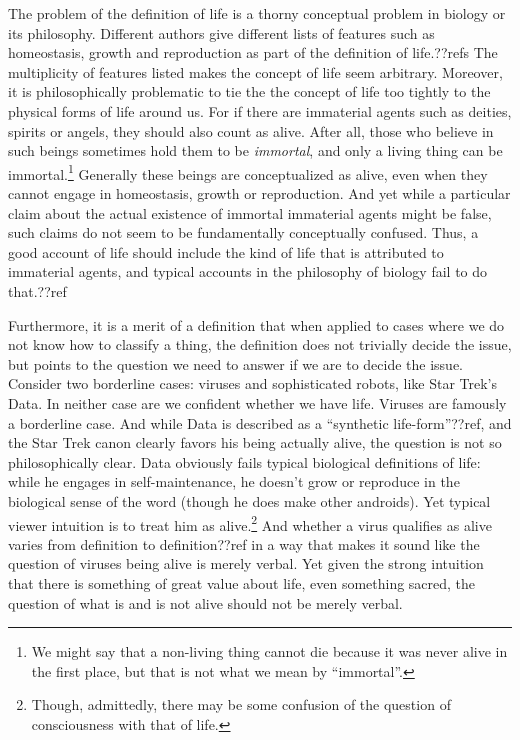 The problem of the definition of life is a thorny conceptual problem in biology or its philosophy. Different authors give different lists of features such
as homeostasis, growth and reproduction as part of the definition of life.??refs The multiplicity of features listed makes the concept of life seem arbitrary.
Moreover, it is philosophically problematic to tie the the concept of life too tightly to the physical forms of life around us. For if there are immaterial agents such as deities, spirits or angels, they should also count as alive.
 After all, those who believe in such beings sometimes
hold them to be \textit{immortal}, and only a living thing can be immortal.\footnote{We might say that a non-living
thing cannot die because it was never alive in the first place, but that is not what we mean by ``immortal''.}
Generally these beings are conceptualized as alive, even when they cannot engage in homeostasis, growth or reproduction. And yet while a particular 
claim about the actual existence of immortal immaterial agents might be false, such claims do not seem to be fundamentally conceptually confused. Thus, a good account
of life should include the kind of life that is attributed to immaterial agents, and typical accounts in the philosophy of biology fail to do that.??ref

Furthermore, it is a merit of a definition that when applied to cases where we do not know how to classify a thing, the definition does not trivially
decide the issue, but points to the question we need to answer if we are to decide the issue. Consider two borderline cases: viruses
and sophisticated robots, like Star Trek's Data. In neither case are we confident whether we have life. Viruses are famously a borderline case.
And while Data is described as a ``synthetic life-form''??ref, and the Star Trek canon clearly favors his being actually alive, the question is
not so philosophically clear. Data obviously fails typical biological definitions of life: while he engages in self-maintenance, he doesn't grow or
reproduce in the biological sense of the word (though he does make other androids). Yet typical viewer intuition
is to treat him as alive.\footnote{Though,
admittedly, there may be some confusion of the question of consciousness with that of life.} And
whether a virus qualifies as alive varies from definition
to definition??ref in a way that makes it sound like the question of viruses being alive is merely verbal. Yet given the strong intuition that there
is something of great value about life, even something sacred, the question of what is and is not alive should not be merely verbal.

